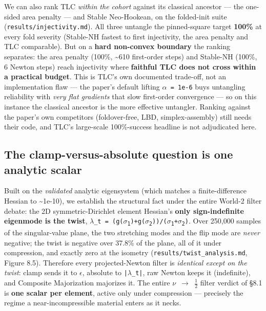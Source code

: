 \documentclass{egpubl}
\begin{document}
We can also rank TLC \emph{within the cohort} against its classical ancestor --- the one-sided area penalty ---
and Stable Neo-Hookean, on the folded-init suite (\texttt{results/injectivity.md}). All three untangle the
pinned-square target \textbf{100\%} at every fold severity (Stable-NH fastest to first injectivity, the area
penalty and TLC comparable). But on a \textbf{hard non-convex boundary} the ranking separates: the area
penalty (100\%, \textasciitilde{}610 first-order steps) and Stable-NH (100\%, 6 Newton steps) reach injectivity where
\textbf{faithful TLC does not cross within a practical budget}. This is TLC's own documented trade-off, not
an implementation flaw --- the paper's default lifting \texttt{$\alpha$ = 1e-6} buys untangling reliability with \emph{very
flat gradients} that slow first-order convergence --- so on this instance the classical ancestor is the
more effective untangler. Ranking against the paper's own competitors (foldover-free, LBD,
simplex-assembly) still needs their code, and TLC's large-scale 100\%-success headline is not
adjudicated here.

\subsection{The clamp-versus-absolute question is one analytic scalar}

Built on the \emph{validated} analytic eigensystem \cite{analytic-eigensystems} (which matches a finite-difference Hessian to \textasciitilde{}1e-10),
we establish the structural fact under the entire World-2 filter debate: the 2D symmetric-Dirichlet
element Hessian's \textbf{only sign-indefinite eigenmode is the twist}, \texttt{$\lambda$\_t = (g($\sigma$\textsubscript{1})+g($\sigma$\textsubscript{2}))/($\sigma$\textsubscript{1}+$\sigma$\textsubscript{2})}. Over
250,000 samples of the singular-value plane, the two stretching modes and the flip mode are \emph{never}
negative; the twist is negative over 37.8\% of the plane, all of it under compression, and exactly zero
at the isometry (\texttt{results/twist\_analysis.md}, Figure 8.5). Therefore every projected-Newton filter is
\emph{identical except on the twist}: clamp sends it to $\epsilon$, absolute to \texttt{|$\lambda$\_t|}, raw Newton keeps it
(indefinite), and Composite Majorization \cite{composite-majorization} majorizes it. The entire \texttt{$\nu$ $\rightarrow$ $\tfrac12$} filter verdict of \S8.1 is
\textbf{one scalar per element}, active only under compression --- precisely the regime a near-incompressible
material enters as it necks.
\end{document}
